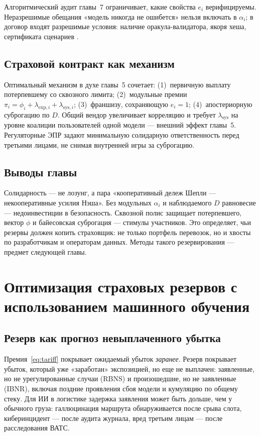 \documentclass[a4paper,14pt]{extarticle}
\begin{document}
Алгоритмический аудит главы~7 ограничивает, какие свойства $e_i$ верифицируемы. Неразрешимые обещания «модель никогда не ошибется» нельзя включать в $\alpha_i$; в договор входят разрешимые условия: наличие оракула-валидатора, якоря хеша, сертификата сценариев \cite{vereshchagin, cormen, cbr}.

\subsection{Страховой контракт как механизм}

Оптимальный механизм в духе главы~5 сочетает: (1)~первичную выплату потерпевшему со сквозного лимита; (2)~модульные премии $\pi_i=\phi_i+\lambda_{\mathrm{exp},i}+\lambda_{\mathrm{sys},i}$; (3)~франшизу, сохраняющую $e_i=1$; (4)~апостериорную суброгацию по $D$. Общий вендор увеличивает корреляцию и требует $\lambda_{\mathrm{sys}}$ на уровне коалиции пользователей одной модели --- внешний эффект главы~5. Регуляторные ЭПР \cite{fz169} задают минимальную солидарную ответственность перед третьими лицами, не снимая внутренней игры за суброгацию.

\subsection{Выводы главы}

Солидарность --- не лозунг, а пара «кооперативный дележ Шепли --- некооперативные усилия Нэша». Без модульных $\alpha_i$ и наблюдаемого $D$ равновесие --- недоинвестиции в безопасность. Сквозной полис защищает потерпевшего, вектор $\phi$ и байесовская суброгация --- стимулы участников. Это определяет, чьи резервы должен копить страховщик: не только портфель перевозок, но и хвосты по разработчикам и операторам данных. Методы такого резервирования --- предмет следующей главы.

\section{Оптимизация страховых резервов с использованием машинного обучения}

\subsection{Резерв как прогноз невыплаченного убытка}

Премия~\eqref{eq:tariff} покрывает ожидаемый убыток \emph{заранее}. Резерв покрывает убыток, который уже «заработан» экспозицией, но еще не выплачен: заявленные, но не урегулированные случаи (RBNS) и произошедшие, но не заявленные (IBNR), включая поздние проявления сбоя модели и кумуляцию по общему стеку. Для ИИ в логистике задержка заявления может быть дольше, чем у обычного груза: галлюцинация маршрута обнаруживается после срыва слота, киберинцидент --- после аудита журнала, вред третьим лицам --- после расследования ВАТС.
\end{document}
